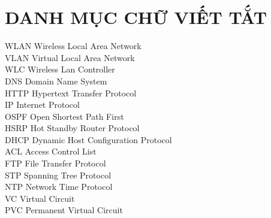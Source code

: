 \documentclass[12pt,a4paper]{report}
\begin{document}
\section*{DANH MỤC CHỮ VIẾT TẮT}
\hspace*{0.25cm}WLAN  \hspace*{1cm}Wireless Local Area Network\\
\hspace*{1cm}VLAN     \hspace*{1cm}Virtual Local Area Network\\
\hspace*{1cm}WLC      \hspace*{1.25cm}Wireless Lan Controller\\
\hspace*{1cm}DNS      \hspace*{1.45cm}Domain Name System \\
\hspace*{1cm}HTTP     \hspace*{1.25cm}Hypertext Transfer Protocol\\
\hspace*{1cm}IP       \hspace*{2cm}Internet Protocol \\
\hspace*{1cm}OSPF     \hspace*{1.25cm}Open Shortest Path First   \\
\hspace*{1cm}HSRP     \hspace*{1.25cm}Hot Standby Router Protocol  \\
\hspace*{1cm}DHCP     \hspace*{1.25cm}Dynamic Host Configuration Protocol\\
\hspace*{1cm}ACL      \hspace*{1.5cm}Access Control List \\
\hspace*{1cm}FTP      \hspace*{1.5cm}File Transfer Protocol  \\
\hspace*{1cm}STP      \hspace*{1.5cm}Spanning Tree Protocol \\
\hspace*{1cm}NTP      \hspace*{1.5cm}Network Time Protocol \\
\hspace*{1cm}VC       \hspace*{1.5cm}Virtual Circuit\\
\hspace*{1cm}PVC      \hspace*{1.5cm}Permanent Virtual Circuit \\
\cleardoublepage
\end{document}
